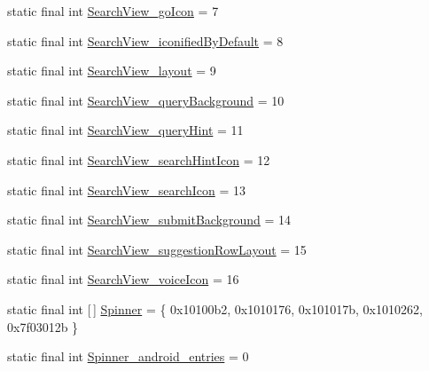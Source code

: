 \begin{DoxyCompactItemize}
static final int \mbox{\hyperlink{classcom_1_1synnapps_1_1carouselview_1_1_r_1_1styleable_aaef2e099c95f942ee952c0991b027fa1}{Search\+View\+\_\+go\+Icon}} = 7
\item 
static final int \mbox{\hyperlink{classcom_1_1synnapps_1_1carouselview_1_1_r_1_1styleable_a7939f2eaedd9f50129c293b5e523214d}{Search\+View\+\_\+iconified\+By\+Default}} = 8
\item 
static final int \mbox{\hyperlink{classcom_1_1synnapps_1_1carouselview_1_1_r_1_1styleable_a5fd5644817202bedfe35f3e4ddce2b30}{Search\+View\+\_\+layout}} = 9
\item 
static final int \mbox{\hyperlink{classcom_1_1synnapps_1_1carouselview_1_1_r_1_1styleable_a3bee286bacaf6e3d99384e70ba1472dc}{Search\+View\+\_\+query\+Background}} = 10
\item 
static final int \mbox{\hyperlink{classcom_1_1synnapps_1_1carouselview_1_1_r_1_1styleable_a4133655a942c7a6cc329fe9751d4e564}{Search\+View\+\_\+query\+Hint}} = 11
\item 
static final int \mbox{\hyperlink{classcom_1_1synnapps_1_1carouselview_1_1_r_1_1styleable_a18b19d8da4098751552521dc7b003dba}{Search\+View\+\_\+search\+Hint\+Icon}} = 12
\item 
static final int \mbox{\hyperlink{classcom_1_1synnapps_1_1carouselview_1_1_r_1_1styleable_a79cd101a07d9861b0d3aa28df4bb1522}{Search\+View\+\_\+search\+Icon}} = 13
\item 
static final int \mbox{\hyperlink{classcom_1_1synnapps_1_1carouselview_1_1_r_1_1styleable_ab4349b9cccacf3db8b1d3f68f2487db8}{Search\+View\+\_\+submit\+Background}} = 14
\item 
static final int \mbox{\hyperlink{classcom_1_1synnapps_1_1carouselview_1_1_r_1_1styleable_afa631f109e3a1cd6f334316011de8614}{Search\+View\+\_\+suggestion\+Row\+Layout}} = 15
\item 
static final int \mbox{\hyperlink{classcom_1_1synnapps_1_1carouselview_1_1_r_1_1styleable_ab01ff93c4e016ba3420d6db593fcd4c7}{Search\+View\+\_\+voice\+Icon}} = 16
\item 
static final int \mbox{[}$\,$\mbox{]} \mbox{\hyperlink{classcom_1_1synnapps_1_1carouselview_1_1_r_1_1styleable_a46e68f4a07c74f0f16868ebb4e26731a}{Spinner}} = \{ 0x10100b2, 0x1010176, 0x101017b, 0x1010262, 0x7f03012b \}
\item 
static final int \mbox{\hyperlink{classcom_1_1synnapps_1_1carouselview_1_1_r_1_1styleable_abc65675b9920e3335d44097c0b1eace8}{Spinner\+\_\+android\+\_\+entries}} = 0
\item 

\end{DoxyCompactItemize}
